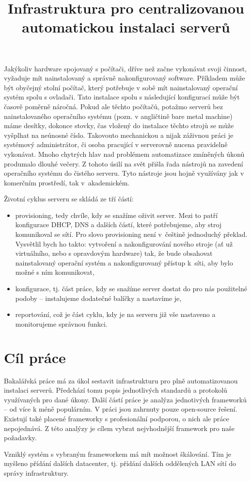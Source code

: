 \documentclass[thesis=B,czech]{FITthesis}[2012/06/26]
\title{Infrastruktura pro centralizovanou automatickou instalaci serverů}
\begin{document}

\begin{introduction}
Jakýkoliv hardware spojovaný s počítači, dříve než začne vykonávat svoji činnost, vyžaduje mít nainstalovaný a správně nakonfigurovaný software. Příkladem může být obyčejný stolní počítač, který potřebuje v sobě mít nainstalovaný operační systém spolu s ovladači. Tato instalace spolu s následující konfigurací může být časově poměrně náročná. Pokud ale těchto počítačů, potažmo serverů bez nainstalovaného operačního systému (pozn. v angličtině bare metal machine) máme desítky, dokonce stovky, čas vložený do instalace těchto strojů se může vyšplhat na neúnosné číslo. Takovouto mechanickou a nijak záživnou práci je systémový administrátor, či osoba pracující v serverovně nucena pravidelně vykonávat. Mnoho chytrých hlav nad problémem automatizace zmíněných úkonů produmalo dlouhé večery. Z tohoto úsilí na svět přišla řada nástrojů na zavedení operačního systému do čistého serveru. Tyto nástroje jsou hojně využívány jak v komerčním prostředí, tak v~akademickém.

Životní cyklus serveru se skládá ze tří částí:
\begin{itemize}
\item provisioning, tedy chvíle, kdy se snažíme oživit server. Mezi to patří konfigurace DHCP, DNS a dalších částí, které potřebujeme, aby stroj komunikoval se sítí. Pro slovo provisioning není v~češtině jednoduchý překlad. Vysvětlil bych ho takto: vytvoření a nakonfigurování nového stroje (ať už virtuálního, nebo s opravdovým hardware) tak, že bude obsahovat nainstalovaný operační systém a nakonfigurovaný přístup k~síti, aby bylo možné s ním komunikovat,
\item konfigurace, tj. část práce, kdy se snažíme server dostat do pro nás použitelné podoby -- instalujeme dodatečné balíčky a nastavíme je, 
\item reportování, což je část cyklu, kdy je na serveru již vše nastaveno a monitorujeme správnou funkci.
\end{itemize}



\section{Cíl práce}
Bakalářská práce má za úkol sestavit infrastrukturu pro plně automatizovanou instalaci serverů. Předchází tomu popis jednotlivých standardů a protokolů využívaných pro dané úkony. Další částí práce je analýza jednotivých frameworků -- od více k méně populárním. V práci jsou zahrnuty pouze open-source řešení. Existují také placené frameworky s profesionální podporou, o nich ale práce nepojednává. Z této analýzy je cílem vybrat nejvhodnější framework pro naše požadavky.

Vzniklý systém s vybraným frameworkem má mít možnost škálování. Tím je myšleno přídání dalších datacenter, tj. přídání dalších oddělených LAN sítí do správy infrastruktury.
\end{introduction}
\end{document}
